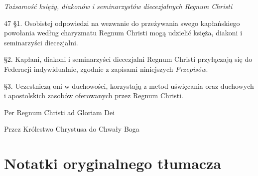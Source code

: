 ﻿\documentclass{report}
\newcommand{\lett}[1]{\lettrine[findent=6pt]{#1}{}}
\newcommand{\ssec}[1]{\vspace{1em}\textit{#1}\vspace{.5em}\nopagebreak}
\begin{document}
\ssec{Tożsamość księży, diakonów i seminarzystów diecezjalnych Regnum Christi}


\lett{47} \S{}1. Osobistej odpowiedzi na wezwanie do przeżywania swego kapłańskiego powołania według charyzmatu Regnum Christi mogą udzielić księża, diakoni i seminarzyści diecezjalni. 


\S{}2. Kapłani, diakoni i seminarzyści diecezjalni Regnum Christi przyłączają się do Federacji indywidualnie, zgodnie z zapisami niniejszych {\em Przepisów}.


\S{}3. Uczestniczą oni w duchowości, korzystają z metod uświęcania oraz duchowych i apostolskich zasobów oferowanych przez Regnum Christi.


\newpage
\vspace*{6cm}
\begin{center}
Per Regnum Christi ad Gloriam Dei


Przez Królestwo Chrystusa do Chwały Boga
\end{center}


\appendix


\chapter{Notatki oryginalnego tłumacza}
\end{document}

